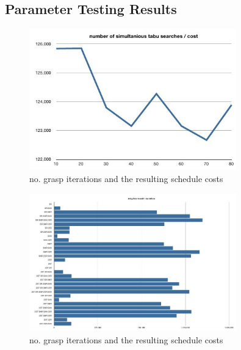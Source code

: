 \documentclass[a4paper,11pt]{article}
\begin{document}
\begin{appendix}
\section{Parameter Testing Results}\label{sec:ptr}

\begin{figure}[htb]
  \begin{center}
    \includegraphics[width=0.8\textwidth]{images/no_grasp_iterations_costs}
  \end{center}
  \caption{no. grasp iterations and the resulting schedule costs}
  \label{fig:tabu_len_cost}
\end{figure}

\begin{figure}[htb]
  \begin{center}
    \includegraphics[width=0.8\textwidth]{images/neighborhood_duration}
  \end{center}
  \caption{no. grasp iterations and the resulting schedule costs}
  \label{fig:tabu_len_cost}
\end{figure}



\end{appendix}
\end{document}
